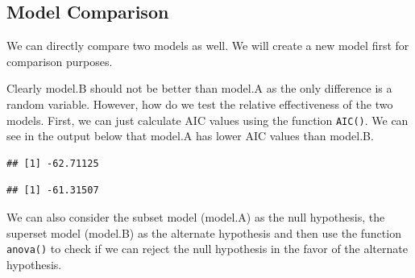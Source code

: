 \documentclass[11pt, letterpaper, twoside]{memoir}\usepackage{knitr}
\begin{document}
\subsection{Model Comparison}

We can directly compare two models as well. We will create a new model first for comparison purposes.

\begin{knitrout}
\color{fgcolor}\begin{kframe}
\begin{alltt}
\hlopt{$} \hlkwb{<-} \hlstd{(}  
 \hlkwb{<-} \hlstd{(} \hlopt{~}  \hlopt{+}   
 \hlkwb{<-} \hlstd{(} \hlopt{~}  \hlopt{+}  \hlopt{+} \hlopt{$}  
\end{alltt}
\end{kframe}
\end{knitrout}

Clearly model.B should not be better than model.A as the only difference is a random variable. However, how do we test the relative effectiveness of the two models. First, we can just calculate AIC values using the function \texttt{AIC()}. We can see in the output below that model.A has lower AIC values than model.B.

\begin{knitrout}
\color{fgcolor}\begin{kframe}
\begin{alltt}
\end{alltt}
\begin{verbatim}
## [1] -62.71125
\end{verbatim}
\begin{alltt}
\end{alltt}
\begin{verbatim}
## [1] -61.31507
\end{verbatim}
\end{kframe}
\end{knitrout}

We can also consider the subset model (model.A) as the null hypothesis, the superset model (model.B) as the alternate hypothesis and then use the function \texttt{anova()} to check if we can reject the null hypothesis in the favor of the alternate hypothesis.
\end{document}
